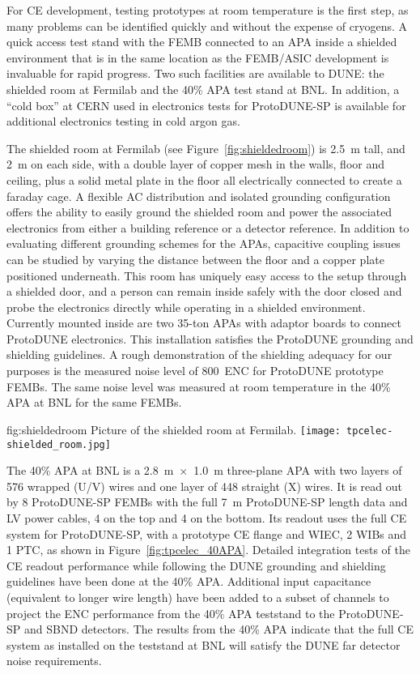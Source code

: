 For CE development, testing prototypes at room temperature is the first step, as many problems can be identified quickly and without the expense of cryogens.  A quick access test stand with the FEMB connected to an APA inside a shielded environment that is in the same location as the FEMB/ASIC development is invaluable for rapid progress.  Two such facilities are available to DUNE: the shielded room at Fermilab and the 40\% APA test stand at BNL.  In addition, a ``cold box'' at CERN used in electronics tests for ProtoDUNE-SP is available for additional electronics testing in cold argon gas.

The shielded room at Fermilab (see Figure~\ref{fig:shieldedroom}) is 2.5~m tall, and 2~m on each side, with 
a double layer of copper mesh in the walls, floor and ceiling, plus a solid metal plate in the floor all electrically connected to create a faraday cage.  A flexible AC distribution and isolated grounding configuration offers the ability to easily ground the shielded room and power the associated electronics from either a building reference or a detector reference.  In addition
to evaluating different grounding schemes for the APAs, capacitive coupling issues can be studied by varying the
distance between the floor and a copper plate positioned underneath.   
This room has uniquely easy access to the setup through a shielded door,
and a person can remain inside safely with the door closed and probe the electronics directly while operating
in a shielded environment.  Currently mounted inside are two 35-ton APAs 
with adaptor boards to connect ProtoDUNE electronics.  This installation satisfies the ProtoDUNE grounding and shielding guidelines.  A rough demonstration of the shielding adequacy for our purposes  is the measured noise level of 800~ENC for ProtoDUNE prototype FEMBs.  The same noise level was measured at room temperature in the 40\% APA at BNL for the same FEMBs.

\begin{dunefigure}
{fig:shieldedroom}
{Picture of the shielded room at Fermilab.}
\texttt{[image: tpcelec-shielded\_room.jpg]}
\end{dunefigure}

The 40\% APA at BNL is a 2.8~m~$\times$~1.0~m three-plane APA with two layers of 576 wrapped (U/V) wires and one layer of 448 straight (X) wires. It is read out by 8 ProtoDUNE-SP FEMBs with the full 7~m ProtoDUNE-SP length data and LV power cables, 4 on the top and 4 on the bottom. Its readout uses the full CE system for ProtoDUNE-SP, with a prototype CE flange and WIEC, 2 WIBs and 1 PTC, as shown in Figure~\ref{fig:tpcelec_40APA}. Detailed integration tests of the CE readout performance while following the DUNE grounding and shielding guidelines have been done at the 40\% APA. Additional input capacitance (equivalent to longer wire length) have been added to a subset of channels to project the ENC performance from the 40\% APA teststand to the ProtoDUNE-SP and SBND detectors. The results from the 40\% APA indicate that the full CE system as installed on the teststand at BNL will satisfy the DUNE far detector noise requirements.

